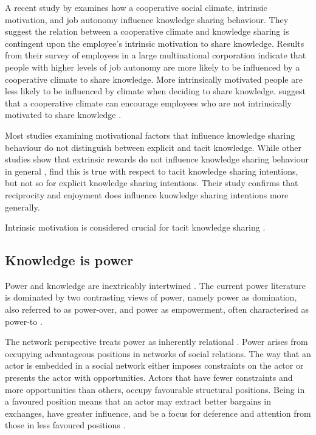 A recent study by \citet{llopis2016understanding} examines how a cooperative social climate, intrinsic motivation, and job autonomy influence knowledge sharing behaviour. They suggest the relation between a cooperative climate and knowledge sharing is contingent upon the employee's intrinsic motivation to share knowledge. Results from their survey of employees in a large multinational corporation indicate that people with higher levels of job autonomy are more likely to be influenced by a cooperative climate to share knowledge. More intrinsically motivated people are less likely to be influenced by climate when deciding to share knowledge. \citet{llopis2016understanding} suggest that a cooperative climate can encourage employees who are not intrinsically motivated to share knowledge . \medskip

Most studies examining motivational factors that influence knowledge sharing behaviour do not distinguish between explicit and tacit knowledge. While other studies show that extrinsic rewards do not influence knowledge sharing behaviour in general \citep[e.g.][]{bock2001breaking,bock2005behavioral,lin2007effects}, \citet{hau2013effects} find this is true with respect to tacit knowledge sharing intentions, but not so for explicit knowledge sharing intentions. Their study confirms that reciprocity and enjoyment does influence knowledge sharing intentions more generally. \medskip

Intrinsic motivation is considered crucial for tacit knowledge sharing \citep{osterloh2000motivation}. 

\subsection{Knowledge is power}

Power and knowledge are inextricably intertwined \citep{gaventa2007power}. The current power literature is dominated by two contrasting views of power, namely power as domination, also referred to as power-over, and power as empowerment, often characterised as power-to \citep{haugaard2012rethinking}. 




The network perspective treats power as inherently relational \citep{ibarra1993network}. Power arises from occupying advantageous positions in networks of social relations. The way that an actor is embedded in a social network either imposes constraints on the actor or presents the actor with opportunities. Actors that have fewer constraints and more opportunities than others, occupy favourable structural positions. Being in a favoured position means that an actor may extract better bargains in exchanges, have greater influence, and be a focus for deference and attention from those in less favoured positions \citep{burt1992structural,hanneman2005introduction}. 

